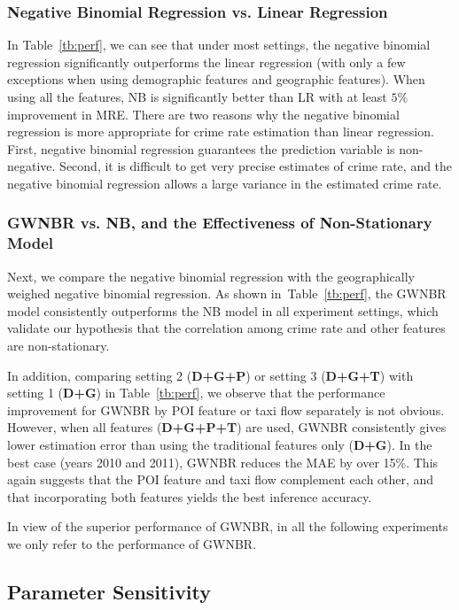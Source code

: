 \subsubsection{Negative Binomial Regression vs. Linear Regression}
In Table~\ref{tb:perf},  we can see that under most settings, the negative binomial regression significantly outperforms the linear regression (with only a few exceptions when using demographic features and geographic features). When using all the features, NB is significantly better than LR with at least $5\%$ improvement in MRE.
There are two reasons why the negative binomial regression is more appropriate for crime rate estimation than linear regression.
First, negative binomial regression guarantees the prediction variable is non-negative. Second, it is difficult to get very precise estimates of crime rate, and the negative binomial regression allows a large variance in the estimated crime rate. 


\subsubsection{GWNBR vs. NB, and the Effectiveness of Non-Stationary Model}
Next, we compare the negative binomial regression with the geographically weighed negative binomial regression. As shown in~Table~\ref{tb:perf}, the GWNBR model consistently outperforms the NB model in all experiment settings, which validate our hypothesis that the correlation among crime rate and other features are non-stationary. 

In addition, comparing setting 2 (\textbf{D+G+P}) or setting 3 (\textbf{D+G+T}) with setting 1 (\textbf{D+G}) in Table~\ref{tb:perf}, we observe that the performance improvement for GWNBR by POI feature or taxi flow separately is not obvious. However, when all features (\textbf{D+G+P+T}) are used, GWNBR consistently gives lower estimation error than using the traditional features only (\textbf{D+G}). In the best case (years 2010 and 2011), GWNBR reduces the MAE by over 15\%. This again suggests that the POI feature and taxi flow complement each other, and that incorporating both features yields the best inference accuracy.


In view of the superior performance of GWNBR, in all the following experiments we only refer to the performance of GWNBR.


\subsection{Parameter Sensitivity}
\label{sec:parameter}

